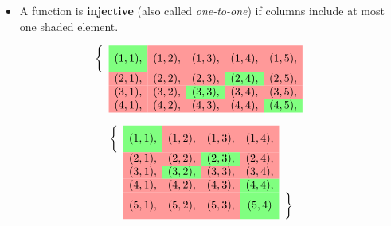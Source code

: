 \documentclass[10pt]{beamer}
\begin{document}
\begin{frame}
\footnotesize 

\begin{myyellowbox}[title=Injective]
\begin{itemize}
	\item A function is \textbf{injective} (also called \textit{one-to-one}) if columns include at most one shaded element. 
\end{itemize}
\end{myyellowbox}

   \vfill 
\begin{mygreenbox}[title=Example]
     \[
    \begin{array}{ccccccc}
        \bigg\{ &   \cellcolor{green!50} (1,1), & \cellcolor{red!40} (1,2), & \cellcolor{red!40} (1,3), & \cellcolor{red!40} (1,4), & \cellcolor{red!40} (1,5), &\\
         & \cellcolor{red!40} (2,1), & \cellcolor{red!40} (2,2), & \cellcolor{red!40} (2,3), & \cellcolor{green!50} (2,4), & \cellcolor{red!40} (2,5), &\\
        & \cellcolor{red!40} (3,1), & \cellcolor{red!40} (3,2), & \cellcolor{green!50} (3,3), & \cellcolor{red!40} (3,4), & \cellcolor{red!40} (3,5), &\\
        & \cellcolor{red!40} (4,1), & \cellcolor{red!40} (4,2), & \cellcolor{red!40} (4,3), & \cellcolor{red!40} (4,4), & \cellcolor{green!50} (4,5), & \\
    \end{array}
    \]
\end{mygreenbox}
\vfill 
\begin{myredbox}[title=Anti-Example]
    \[
    \begin{array}{cccccc}
        \bigg\{ &   \cellcolor{green!50} (1,1), & \cellcolor{red!40} (1,2), & \cellcolor{red!40} (1,3), & \cellcolor{red!40} (1,4), & \\
         & \cellcolor{red!40} (2,1), & \cellcolor{red!40} (2,2), & \cellcolor{green!50} (2,3), & \cellcolor{red!40} (2,4),& \\
        & \cellcolor{red!40} (3,1), & \cellcolor{green!50} (3,2), & \cellcolor{red!40} (3,3), & \cellcolor{red!40} (3,4), & \\
        & \cellcolor{red!40} (4,1), & \cellcolor{red!40} (4,2), & \cellcolor{red!40} (4,3), & \cellcolor{green!50} (4,4), & \\
        & \cellcolor{red!40} (5,1), & \cellcolor{red!40} (5,2), & \cellcolor{red!40} (5,3), & \cellcolor{green!50} (5,4)   &   \bigg\} \\
    \end{array}
    \]
\end{myredbox} 
\end{frame}
\end{document}
